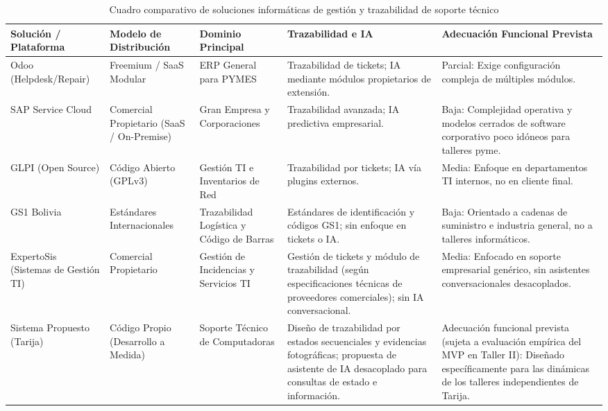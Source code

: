 \begin{table}[H]
\centering
\caption{Cuadro comparativo de soluciones informáticas de gestión y trazabilidad de soporte técnico}
\label{tab:comparativo}
\small
\begin{tabular}{p{2.5cm} p{2.5cm} p{2.5cm} p{3cm} p{3.5cm}}
\toprule
\textbf{Solución / Plataforma} & \textbf{Modelo de Distribución} & \textbf{Dominio Principal} & \textbf{Trazabilidad e IA} & \textbf{Adecuación Funcional Prevista} \\
\midrule
Odoo (Helpdesk/Repair) & Freemium / SaaS Modular & ERP General para PYMES & Trazabilidad de tickets; IA mediante módulos propietarios de extensión. & Parcial: Exige configuración compleja de múltiples módulos. \\
\addlinespace
SAP Service Cloud & Comercial Propietario (SaaS / On-Premise) & Gran Empresa y Corporaciones & Trazabilidad avanzada; IA predictiva empresarial. & Baja: Complejidad operativa y modelos cerrados de software corporativo poco idóneos para talleres pyme. \\
\addlinespace
GLPI (Open Source) & Código Abierto (GPLv3) & Gestión TI e Inventarios de Red & Trazabilidad por tickets; IA vía plugins externos. & Media: Enfoque en departamentos TI internos, no en cliente final. \\
\addlinespace
GS1 Bolivia & Estándares Internacionales & Trazabilidad Logística y Código de Barras & Estándares de identificación y códigos GS1; sin enfoque en tickets o IA. & Baja: Orientado a cadenas de suministro e industria general, no a talleres informáticos. \\
\addlinespace
ExpertoSis (Sistemas de Gestión TI) & Comercial Propietario & Gestión de Incidencias y Servicios TI & Gestión de tickets y módulo de trazabilidad (según especificaciones técnicas de proveedores comerciales); sin IA conversacional. & Media: Enfocado en soporte empresarial genérico, sin asistentes conversacionales desacoplados. \\
\addlinespace
Sistema Propuesto (Tarija) & Código Propio (Desarrollo a Medida) & Soporte Técnico de Computadoras & Diseño de trazabilidad por estados secuenciales y evidencias fotográficas; propuesta de asistente de IA desacoplado para consultas de estado e información. & Adecuación funcional prevista (sujeta a evaluación empírica del MVP en Taller II): Diseñado específicamente para las dinámicas de los talleres independientes de Tarija. \\
\bottomrule
\end{tabular}
\end{table}